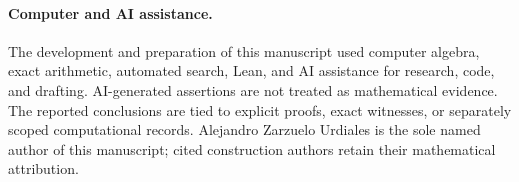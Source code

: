 \paragraph{Computer and AI assistance.}
The development and preparation of this manuscript used computer algebra, exact arithmetic, automated search, Lean, and AI assistance for research, code, and drafting. AI-generated assertions are not treated as mathematical evidence. The reported conclusions are tied to explicit proofs, exact witnesses, or separately scoped computational records. Alejandro Zarzuelo Urdiales is the sole named author of this manuscript; cited construction authors retain their mathematical attribution.
